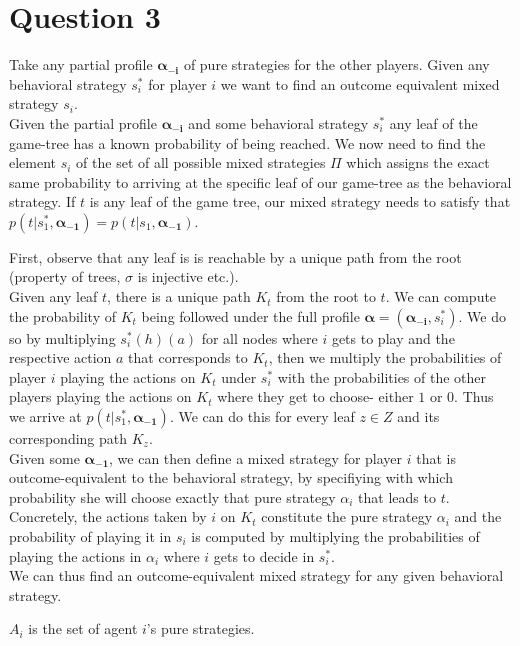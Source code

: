 \documentclass[10pt,a4paper]{article}
\begin{document}
\section*{Question 3}
Take any partial profile $\bm{\alpha_{-i}}$ of pure strategies for the other players. Given any behavioral strategy $s_i^*$ for player $i$ we want to find an outcome equivalent mixed strategy $s_i$. \\
Given the partial profile $\bm{\alpha_{-i}}$ and some behavioral strategy $s_i^*$ any leaf of the game-tree has a known probability of being reached. We now need to find the element $s_i$ of the set of all possible mixed strategies $\Pi$ which assigns the exact same probability to arriving at the specific leaf of our game-tree as the behavioral strategy. If $t$ is any leaf of the game tree, our mixed strategy needs to satisfy that $p(t|s_1^*,\bm{\alpha_{-1}}) = p(t|s_1,\bm{\alpha_{-1}})$.

\noindent First, observe that any leaf is is reachable by a unique path from the root (property of trees, $\sigma$ is injective etc.).\\
Given any leaf $t$, there is a unique path $K_t$ from the root to $t$. We can compute the probability of $K_t$ being followed under the full profile $\bm{\alpha}=(\bm{\alpha_{-i}},s_i^*)$. We do so by multiplying $s_i^*(h)(a)$ for all nodes where $i$ gets to play and the respective action $a$ that corresponds to $K_t$, then we multiply the probabilities of player $i$ playing the actions on $K_t$ under $s_i^*$ with the probabilities  of the other players playing the actions on $K_t$ where they get to choose- either $1$ or $0$. Thus we arrive at $p(t|s_1^*,\bm{\alpha_{-1}})$. We can do this for every leaf $z\in Z$ and its corresponding path $K_z$. \\
Given some $\bm{\alpha_{-1}}$, we can then define a mixed strategy for player $i$ that is outcome-equivalent to the behavioral strategy, by specifiying with which probability she will choose exactly that pure strategy $\alpha_i$ that leads to $t$. Concretely, the actions taken by $i$ on $K_t$ constitute the pure strategy $\alpha_i$ and the probability of playing it in $s_i$ is computed by multiplying the probabilities of playing the actions in $\alpha_i$ where $i$ gets to decide in $s_i^*$.\\
We can thus find an outcome-equivalent mixed strategy for any given behavioral strategy.

$A_i$ is the set of agent $i$'s pure strategies.\\
\end{document}
